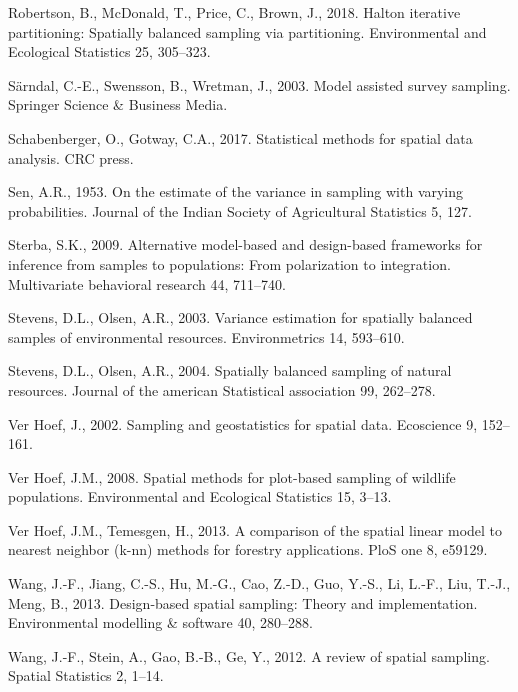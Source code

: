 \documentclass[]{elsarticle} %
\begin{document}
\leavevmode\hypertarget{ref-robertson2018halton}{}%
Robertson, B., McDonald, T., Price, C., Brown, J., 2018. Halton
iterative partitioning: Spatially balanced sampling via partitioning.
Environmental and Ecological Statistics 25, 305--323.

\leavevmode\hypertarget{ref-sarndal2003model}{}%
Särndal, C.-E., Swensson, B., Wretman, J., 2003. Model assisted survey
sampling. Springer Science \& Business Media.

\leavevmode\hypertarget{ref-schabenberger2017statistical}{}%
Schabenberger, O., Gotway, C.A., 2017. Statistical methods for spatial
data analysis. CRC press.

\leavevmode\hypertarget{ref-sen1953estimate}{}%
Sen, A.R., 1953. On the estimate of the variance in sampling with
varying probabilities. Journal of the Indian Society of Agricultural
Statistics 5, 127.

\leavevmode\hypertarget{ref-sterba2009alternative}{}%
Sterba, S.K., 2009. Alternative model-based and design-based frameworks
for inference from samples to populations: From polarization to
integration. Multivariate behavioral research 44, 711--740.

\leavevmode\hypertarget{ref-stevens2003variance}{}%
Stevens, D.L., Olsen, A.R., 2003. Variance estimation for spatially
balanced samples of environmental resources. Environmetrics 14,
593--610.

\leavevmode\hypertarget{ref-stevens2004spatially}{}%
Stevens, D.L., Olsen, A.R., 2004. Spatially balanced sampling of natural
resources. Journal of the american Statistical association 99, 262--278.

\leavevmode\hypertarget{ref-verhoef2002sampling}{}%
Ver Hoef, J., 2002. Sampling and geostatistics for spatial data.
Ecoscience 9, 152--161.

\leavevmode\hypertarget{ref-verhoef2008spatial}{}%
Ver Hoef, J.M., 2008. Spatial methods for plot-based sampling of
wildlife populations. Environmental and Ecological Statistics 15, 3--13.

\leavevmode\hypertarget{ref-ver2013comparison}{}%
Ver Hoef, J.M., Temesgen, H., 2013. A comparison of the spatial linear
model to nearest neighbor (k-nn) methods for forestry applications. PloS
one 8, e59129.

\leavevmode\hypertarget{ref-wang2013design}{}%
Wang, J.-F., Jiang, C.-S., Hu, M.-G., Cao, Z.-D., Guo, Y.-S., Li, L.-F.,
Liu, T.-J., Meng, B., 2013. Design-based spatial sampling: Theory and
implementation. Environmental modelling \& software 40, 280--288.

\leavevmode\hypertarget{ref-wang2012review}{}%
Wang, J.-F., Stein, A., Gao, B.-B., Ge, Y., 2012. A review of spatial
sampling. Spatial Statistics 2, 1--14.
\end{document}
